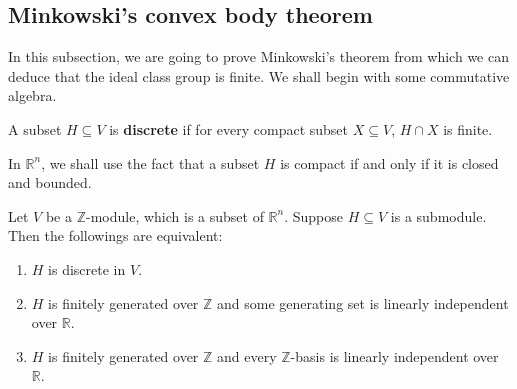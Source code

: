 \subsection{Minkowski's convex body theorem}
In this subsection, we are going to prove Minkowski's theorem from which we can deduce that the ideal class group is finite. We shall begin with some commutative algebra.
\begin{definition} A subset $H \subseteq V$ is {\bf discrete} if for every compact subset $X \subseteq V$,
$H \cap X$ is finite.
\end{definition}
In $\mathbb{R}^n$, we shall use the fact that a subset $H$ is compact if and only if it is closed and bounded.
\begin{lemma} Let $V$ be a $\mathbb{Z}$-module, which is a subset of $\mathbb{R}^n$. Suppose $H \subseteq V$ is a submodule. Then the followings are equivalent:
\begin{enumerate}
\item $H$ is discrete in $V$.
\item $H$ is finitely generated over $\mathbb{Z}$ and some generating set is linearly independent over $\mathbb{R}$.
\item $H$ is finitely generated over $\mathbb{Z}$ and every $\mathbb{Z}$-basis is linearly independent over
$\mathbb{R}$.
\end{enumerate}
\end{lemma}
